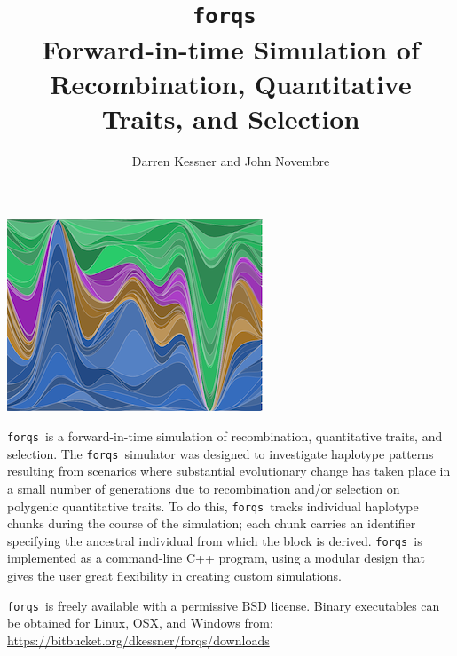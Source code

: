 \documentclass{article}
\newcommand{\forqs}[0]{\texttt{forqs }}
\begin{document}

\title{\forqs \\ Forward-in-time Simulation of Recombination, Quantitative Traits, and Selection}
\author{Darren Kessner and John Novembre}
\maketitle


\begin{center}
    \includegraphics[width=.8\textwidth]{fig/2_locus_selection.png}
\end{center}


\forqs is a forward-in-time simulation of recombination,
quantitative traits, and selection.  The \forqs simulator was designed to
investigate haplotype patterns resulting from scenarios where substantial
evolutionary change has taken place in a small number of generations due to
recombination and/or selection on polygenic quantitative traits.  To do this,
\forqs tracks individual haplotype chunks during the course of the simulation;
each chunk carries an identifier specifying the ancestral individual from which
the block is derived.  \forqs is implemented as a command-line C++ program,
using a modular design that gives the user great flexibility in creating
custom simulations.

\forqs is freely available with a permissive BSD license.  Binary executables
can be obtained for Linux, OSX, and Windows from: \\
\url{https://bitbucket.org/dkessner/forqs/downloads}


\newpage
\end{document}
